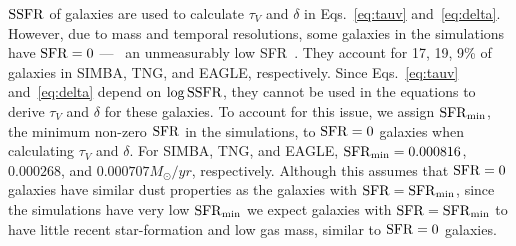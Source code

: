 

${\rm SSFR}$ of galaxies are used to calculate $\tau_V$ and $\delta$ in
Eqs.~\ref{eq:tauv} and~\ref{eq:delta}. However, due to mass and temporal resolutions,
some galaxies in the simulations have ${\rm SFR}=0$ --- \ie~an unmeasurably low
SFR~\citep{hahn2019c}. They account for 17, 19, 9\% of galaxies
in SIMBA, TNG, and EAGLE, respectively. Since Eqs.~\ref{eq:tauv}
and~\ref{eq:delta} depend on $\log{\rm SSFR}$, they cannot be used in the equations
to derive $\tau_V$ and $\delta$ for these galaxies. To account for this issue,
we assign ${\rm SFR}_{\rm min}$, the minimum non-zero ${\rm SFR}$ in the simulations, to
${\rm SFR}=0$ galaxies when calculating $\tau_V$ and $\delta$. For SIMBA, TNG, and
EAGLE, ${\rm SFR}_{\rm min}=0.000816$, $0.000268$, and $0.000707 M_\odot/yr$,
respectively. Although 
this assumes that ${\rm SFR}=0$ galaxies have similar dust properties as the galaxies 
with ${\rm SFR} = {\rm SFR}_{\rm min}$, since the simulations have very low ${\rm SFR}_{\rm min}$ 
we expect galaxies with ${\rm SFR} = {\rm SFR}_{\rm min}$ to have little recent
star-formation and low gas mass, similar to ${\rm SFR}=0$ galaxies. 


